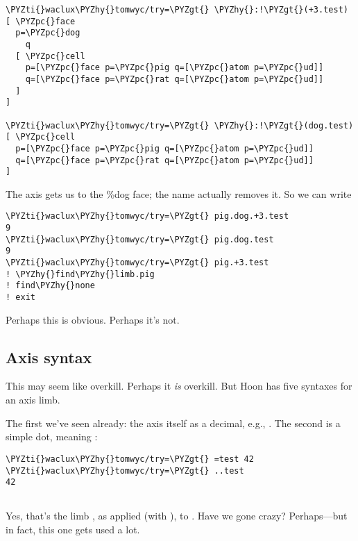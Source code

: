 \begin{framed_shaded}
\begin{Verbatim}[fontsize=\relsize{-2.5},fontseries=b,commandchars=\\\{\}]
\PYZti{}waclux\PYZhy{}tomwyc/try=\PYZgt{} \PYZhy{}:!\PYZgt{}(+3.test)
[ \PYZpc{}face
  p=\PYZpc{}dog
    q
  [ \PYZpc{}cell
    p=[\PYZpc{}face p=\PYZpc{}pig q=[\PYZpc{}atom p=\PYZpc{}ud]]
    q=[\PYZpc{}face p=\PYZpc{}rat q=[\PYZpc{}atom p=\PYZpc{}ud]]
  ]
]

\PYZti{}waclux\PYZhy{}tomwyc/try=\PYZgt{} \PYZhy{}:!\PYZgt{}(dog.test)
[ \PYZpc{}cell
  p=[\PYZpc{}face p=\PYZpc{}pig q=[\PYZpc{}atom p=\PYZpc{}ud]]
  q=[\PYZpc{}face p=\PYZpc{}rat q=[\PYZpc{}atom p=\PYZpc{}ud]]
]
\end{Verbatim}
\end{framed_shaded}
The axis gets us to the \%dog face; the name actually removes it.
So we can write

\begin{framed_shaded}
\begin{Verbatim}[fontsize=\relsize{-2.5},fontseries=b,commandchars=\\\{\}]
\PYZti{}waclux\PYZhy{}tomwyc/try=\PYZgt{} pig.dog.+3.test
9
\PYZti{}waclux\PYZhy{}tomwyc/try=\PYZgt{} pig.dog.test
9
\PYZti{}waclux\PYZhy{}tomwyc/try=\PYZgt{} pig.+3.test
! \PYZhy{}find\PYZhy{}limb.pig
! find\PYZhy{}none
! exit
\end{Verbatim}
\end{framed_shaded}
Perhaps this is obvious.  Perhaps it's not.

\subsection{Axis syntax}

This may seem like overkill.  Perhaps it \emph{is} overkill.  But Hoon
has five syntaxes for an axis limb.

The first we've seen already: the axis itself as a decimal, e.g.,
.  The second is a simple dot, meaning :

\begin{framed_shaded}
\begin{Verbatim}[fontsize=\relsize{-2.5},fontseries=b,commandchars=\\\{\}]
\PYZti{}waclux\PYZhy{}tomwyc/try=\PYZgt{} =test 42
\PYZti{}waclux\PYZhy{}tomwyc/try=\PYZgt{} ..test
42
 
\end{Verbatim}
\end{framed_shaded}
Yes, that's the limb , as applied (with ), to .  Have
we gone crazy?  Perhaps---but in fact, this one gets used a lot.

